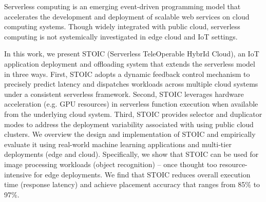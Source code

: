 Serverless computing is an emerging event-driven programming model that accelerates the development and deployment of scalable web services on cloud computing systems. Though widely integrated with public cloud, serverless computing is not systemically investigated in edge cloud and IoT settings.

In this work, we present STOIC (Serverless TeleOperable HybrId Cloud), an IoT application deployment and offloading system that extends the serverless model in three ways. First, STOIC adopts a dynamic feedback control mechanism to precisely predict latency and dispatches workloads across multiple cloud systems under a consistent serverless framework. Second, STOIC leverages hardware acceleration (e.g. GPU resources) in serverless function execution when available from the underlying cloud system. Third, STOIC provides selector and duplicator modes to address the deployment variability associated with using public cloud clusters. We overview the design and implementation of STOIC and empirically evaluate it using real-world machine learning applications and multi-tier deployments (edge and cloud). Specifically, we show that STOIC can be used for image processing workloads (object recognition) -- once thought too resource-intensive for edge deployments. We find that STOIC reduces overall execution time (response latency) and achieve placement accuracy that ranges from 85\% to 97\%.
